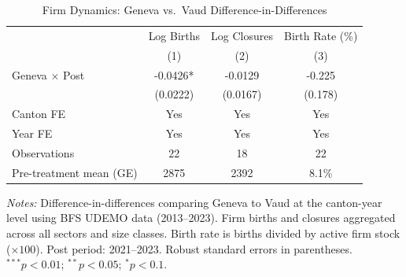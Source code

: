 \begin{table}[htbp]
\centering
\caption{Firm Dynamics: Geneva vs.\ Vaud Difference-in-Differences}
\label{tab:udemo}
\begin{threeparttable}
\begin{tabular}{lccc}
\toprule
 & Log Births & Log Closures & Birth Rate (\%) \\
 & (1) & (2) & (3) \\
\midrule
Geneva $\times$ Post & -0.0426* & -0.0129 & -0.225 \\
 & (0.0222) & (0.0167) & (0.178) \\
\midrule
Canton FE & Yes & Yes & Yes \\
Year FE & Yes & Yes & Yes \\
Observations & 22 & 18 & 22 \\
Pre-treatment mean (GE) & 2875 & 2392 & 8.1\% \\
\bottomrule
\end{tabular}
\begin{tablenotes}[flushleft]
\small
\item \textit{Notes:} Difference-in-differences comparing Geneva to Vaud at the
canton-year level using BFS UDEMO data (2013--2023). Firm births and closures aggregated
across all sectors and size classes. Birth rate is births divided by active firm stock ($\times 100$).
Post period: 2021--2023. Robust standard errors in parentheses.
$^{***}p<0.01$; $^{**}p<0.05$; $^{*}p<0.1$.
\end{tablenotes}
\end{threeparttable}
\end{table}
